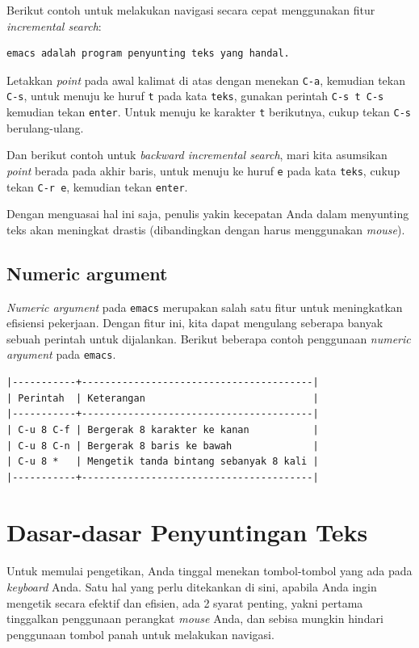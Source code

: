 \documentclass{article}
\begin{document}
Berikut contoh untuk melakukan navigasi secara cepat menggunakan fitur
\emph{incremental search}:

\begin{verbatim}
emacs adalah program penyunting teks yang handal.
\end{verbatim}

Letakkan \emph{point} pada awal kalimat di atas dengan menekan \verb=C-a=, 
kemudian tekan \verb=C-s=, untuk menuju ke huruf \verb=t= pada kata 
\verb=teks=, gunakan perintah \verb=C-s t C-s= kemudian tekan \verb=enter=. 
Untuk menuju ke karakter \verb=t= berikutnya, cukup tekan \verb=C-s=
berulang-ulang.

Dan berikut contoh untuk \emph{backward incremental search}, mari kita
asumsikan \emph{point} berada pada akhir baris, untuk menuju ke huruf 
\verb=e= pada kata \verb=teks=, cukup tekan \verb=C-r e=, kemudian tekan 
\verb=enter=.

Dengan menguasai hal ini saja, penulis yakin kecepatan Anda dalam menyunting 
teks akan meningkat drastis (dibandingkan dengan harus menggunakan 
\emph{mouse}).

\subsection{Numeric argument}
\emph{Numeric argument} pada \verb=emacs= merupakan salah satu fitur
untuk meningkatkan efisiensi pekerjaan. Dengan fitur ini, kita dapat 
mengulang seberapa banyak sebuah perintah untuk dijalankan. Berikut 
beberapa contoh penggunaan \emph{numeric argument} pada \verb=emacs=.

\begin{verbatim}
|-----------+----------------------------------------|
| Perintah  | Keterangan                             |
|-----------+----------------------------------------|
| C-u 8 C-f | Bergerak 8 karakter ke kanan           |
| C-u 8 C-n | Bergerak 8 baris ke bawah              |
| C-u 8 *   | Mengetik tanda bintang sebanyak 8 kali |
|-----------+----------------------------------------|
\end{verbatim}

\section{Dasar-dasar Penyuntingan Teks}

Untuk memulai pengetikan, Anda tinggal menekan tombol-tombol yang ada pada
\emph{keyboard} Anda. Satu hal yang perlu ditekankan di sini, apabila Anda 
ingin mengetik secara efektif dan efisien, ada 2 syarat penting, yakni pertama 
tinggalkan penggunaan perangkat \emph{mouse} Anda, dan sebisa mungkin hindari 
penggunaan tombol panah untuk melakukan navigasi.
\end{document}
